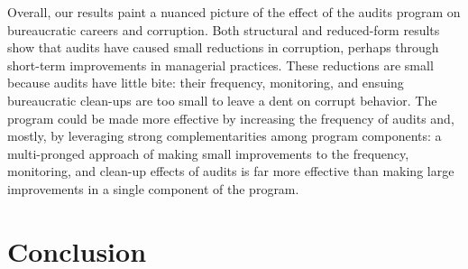 \documentclass[12pt,a4paper]{article}
\theoremstyle{definition}
\begin{document}
{Overall, our results paint a nuanced picture of the effect of the audits program on bureaucratic careers and corruption. Both structural and reduced-form results show that audits have caused small reductions in corruption, perhaps through short-term improvements in managerial practices. These reductions are small because audits have little bite: their frequency, monitoring, and ensuing bureaucratic clean-ups are too small to leave a dent on corrupt behavior. The program could be made more effective by increasing the frequency of audits and, mostly, by leveraging strong complementarities among program components: a multi-pronged approach of making small improvements to the frequency, monitoring, and clean-up effects of audits is far more effective than making large improvements in a single component of the program. 

\section{Conclusion}
\label{sec:conclusion}




}
\end{document}
